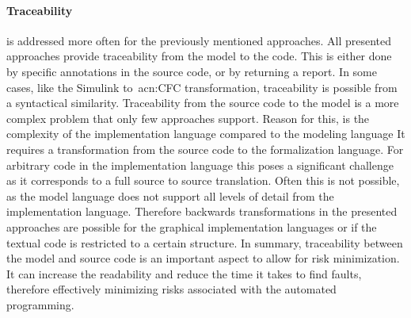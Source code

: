 \paragraph{Traceability} is addressed more often for the previously mentioned approaches.
All presented approaches provide traceability from the model to the code.
This is either done by specific annotations in the source code, or by returning a report.
In some cases, like the Simulink to~\acrshort{acn:CFC} transformation, traceability is possible from a syntactical similarity.
Traceability from the source code to the model is a more complex problem that only few approaches support.
Reason for this, is the complexity of the implementation language compared to the modeling language
It requires a transformation from the source code to the formalization language.
For arbitrary code in the implementation language this poses a significant challenge as it corresponds to a full source to source translation.
Often this is not possible, as the model language does not support all levels of detail from the implementation language.
Therefore backwards transformations in the presented approaches are possible for the graphical implementation languages or if the textual code is restricted to a certain structure.
In summary, traceability between the model and source code is an important aspect to allow for risk minimization.
It can increase the readability and reduce the time it takes to find faults, therefore effectively minimizing risks associated with the automated programming.

